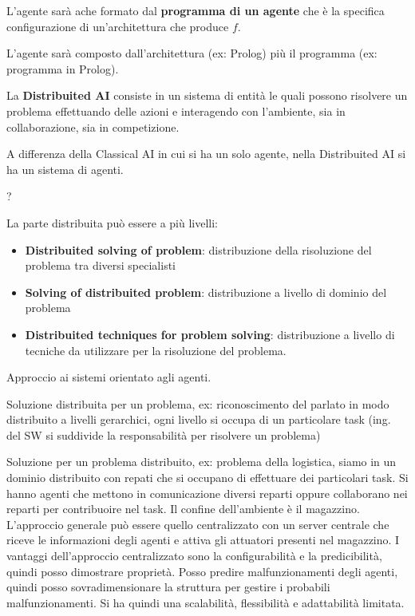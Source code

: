 L'agente sarà ache formato dal \textbf{programma di un agente} che è la specifica
configurazione di un'architettura che produce $f$.

L'agente sarà composto dall'architettura (ex: Prolog) più il programma (ex: programma in Prolog).

\begin{definizione} 
    La \textbf{Distribuited AI} consiste in un sistema di entità le quali possono
    risolvere un problema effettuando delle azioni e interagendo con l'ambiente,
    sia in collaborazione, sia in competizione.
\end{definizione}

A differenza della Classical AI in cui si ha un solo agente, nella Distribuited AI
si ha un sistema di agenti.

\begin{definizione} 
    ?
\end{definizione}

La parte distribuita può essere a più livelli:
\begin{itemize}
    \item \textbf{Distribuited solving of problem}: distribuzione della risoluzione
          del problema tra diversi specialisti
    \item \textbf{Solving of distribuited problem}: distribuzione a livello di dominio
          del problema
    \item \textbf{Distribuited techniques for problem solving}: distribuzione a livello
          di tecniche da utilizzare per la risoluzione del problema.
\end{itemize}


Approccio ai sistemi orientato agli agenti.

Soluzione distribuita per un problema, ex: riconoscimento del parlato
in modo distribuito a livelli gerarchici, ogni livello si occupa di un particolare
task (ing. del SW si suddivide la responsabilità per risolvere un problema)

Soluzione per un problema distribuito, ex: problema della logistica, siamo in un
dominio distribuito con repati che si occupano di effettuare dei particolari task.
Si hanno agenti che mettono in comunicazione diversi reparti oppure collaborano
nei reparti per contribuoire nel task. Il confine dell'ambiente è il magazzino.
L'approccio generale può essere quello centralizzato con un server centrale che
riceve le informazioni degli agenti e attiva gli attuatori presenti nel magazzino.
I vantaggi dell'approccio centralizzato sono la configurabilità e la predicibilità,
quindi posso dimostrare proprietà. Posso predire malfunzionamenti degli agenti,
quindi posso sovradimensionare la struttura per gestire i probabili malfunzionamenti.
Si ha quindi una scalabilità, flessibilità e adattabilità limitata.

